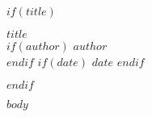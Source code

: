 \documentclass[12pt]{article}
\begin{document}
$if(title)$
\begin{center}
  {\LARGE \textbf{$title$}}\\[1em]
  $if(author)$ {\large $author$} \\[1em] $endif$
  $if(date)$ {\small $date$} $endif$
\end{center}
$endif$

$body$
\end{document}
